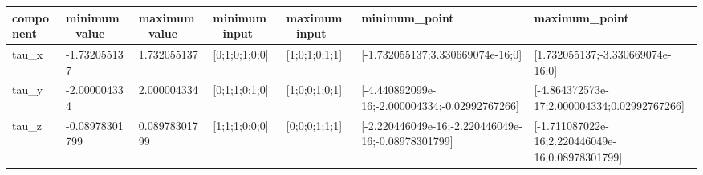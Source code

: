 \begin{tabular}{@{}lllllll@{}}
\toprule
component & minimum\_value & maximum\_value & minimum\_input & maximum\_input & minimum\_point & maximum\_point \\
\midrule
tau\_x & -1.732055137 & 1.732055137 & [0;1;0;1;0;0] & [1;0;1;0;1;1] & [-1.732055137;3.330669074e-16;0] & [1.732055137;-3.330669074e-16;0] \\
tau\_y & -2.000004334 & 2.000004334 & [0;1;1;0;1;0] & [1;0;0;1;0;1] & [-4.440892099e-16;-2.000004334;-0.02992767266] & [-4.864372573e-17;2.000004334;0.02992767266] \\
tau\_z & -0.08978301799 & 0.08978301799 & [1;1;1;0;0;0] & [0;0;0;1;1;1] & [-2.220446049e-16;-2.220446049e-16;-0.08978301799] & [-1.711087022e-16;2.220446049e-16;0.08978301799] \\
\bottomrule
\end{tabular}
